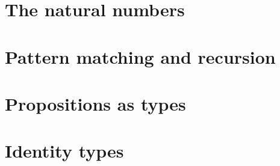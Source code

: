 \section{The natural numbers}
\label{sec:inductive-types}


\section{Pattern matching and recursion}
\label{sec:pattern-matching}


\section{Propositions as types}
\label{sec:pat}


\section{Identity types}
\label{sec:identity-types}


